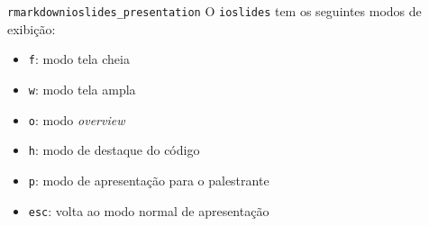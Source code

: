 \documentclass[
  10pt,
  ignorenonframetext,
]{beamer}
\providecommand{\tightlist}{%
  \setlength{\itemsep}{0pt}\setlength{\parskip}{0pt}}\usepackage{longtable,booktabs,array}
\begin{document}
\begin{frame}[fragile]{\texttt{rmarkdown}\newline \texttt{ioslides\_presentation}}
\protect\hypertarget{rmarkdownioslides_presentation-2}{}
O \texttt{ioslides} tem os seguintes modos de exibição:

\begin{itemize}
\tightlist
\item
  \texttt{f}: modo tela cheia
\item
  \texttt{w}: modo tela ampla
\item
  \texttt{o}: modo \emph{overview}
\item
  \texttt{h}: modo de destaque do código
\item
  \texttt{p}: modo de apresentação para o palestrante
\item
  \texttt{esc}: volta ao modo normal de apresentação
\end{itemize}
\end{frame}
\end{document}
